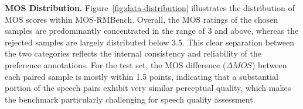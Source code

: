 


\textbf{MOS Distribution.}
Figure~\ref{fig:data-distribution} illustrates the distribution of MOS scores within MOS-RMBench. Overall, the MOS ratings of the chosen samples are predominantly concentrated in the range of 3 and above, whereas the rejected samples are largely distributed below 3.5. This clear separation between the two categories reflects the internal consistency and reliability of the preference annotations.
For the test set, the MOS difference ($\Delta MOS$) between each paired sample is mostly within 1.5 points, indicating that a substantial portion of the speech pairs exhibit very similar perceptual quality, which makes the benchmark particularly challenging for speech quality assessment.


